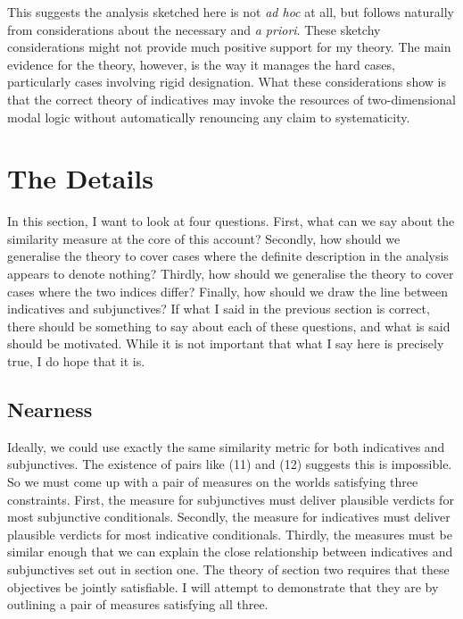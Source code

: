 \documentclass[
  10pt,
  letterpaper,
  DIV=11,
  numbers=noendperiod,
  twoside]{scrartcl}
\begin{document}
This suggests the analysis sketched here is not \emph{ad hoc} at all,
but follows naturally from considerations about the necessary and
\emph{a priori}. These sketchy considerations might not provide much
positive support for my theory. The main evidence for the theory,
however, is the way it manages the hard cases, particularly cases
involving rigid designation. What these considerations show is that the
correct theory of indicatives may invoke the resources of
two-dimensional modal logic without automatically renouncing any claim
to systematicity.

\section{The Details}\label{the-details}

In this section, I want to look at four questions. First, what can we
say about the similarity measure at the core of this account? Secondly,
how should we generalise the theory to cover cases where the definite
description in the analysis appears to denote nothing? Thirdly, how
should we generalise the theory to cover cases where the two indices
differ? Finally, how should we draw the line between indicatives and
subjunctives? If what I said in the previous section is correct, there
should be something to say about each of these questions, and what is
said should be motivated. While it is not important that what I say here
is precisely true, I do hope that it is.

\subsection{Nearness}\label{nearness}

Ideally, we could use exactly the same similarity metric for both
indicatives and subjunctives. The existence of pairs like (11) and (12)
suggests this is impossible. So we must come up with a pair of measures
on the worlds satisfying three constraints. First, the measure for
subjunctives must deliver plausible verdicts for most subjunctive
conditionals. Secondly, the measure for indicatives must deliver
plausible verdicts for most indicative conditionals. Thirdly, the
measures must be similar enough that we can explain the close
relationship between indicatives and subjunctives set out in section
one. The theory of section two requires that these objectives be jointly
satisfiable. I will attempt to demonstrate that they are by outlining a
pair of measures satisfying all three.
\end{document}
